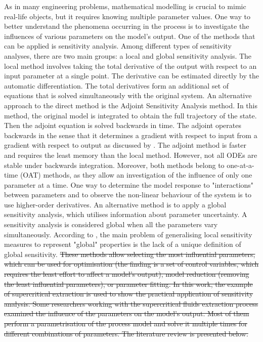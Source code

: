 \documentclass[a4paper,fleqn]{cas-dc}
\begin{document}
As in many engineering problems, mathematical modelling is crucial to mimic real-life objects, but it requires knowing multiple parameter values. One way to better understand the phenomena occurring in the process is to investigate the influences of various parameters on the model's output. One of the methods that can be applied is sensitivity analysis. Among different types of sensitivity analyses, there are two main groups: a local and global sensitivity analysis.
The local method involves taking the total derivative of the output with respect to an input parameter at a single point. The derivative can be estimated directly by the automatic differentiation. {\color{blue}The total derivatives form an additional set of equations that is solved simultaneously with the original system. An alternative approach to the direct method is the Adjoint Sensitivity Analysis method. In this method, the original model is integrated to obtain the full trajectory of the state. Then the adjoint equation is solved backwards in time. The adjoint operates backwards in the sense that it determines a gradient with respect to input from a gradient with respect to output as discussed by \citet{Errico1997}.}
The adjoint method is faster and requires the least memory than the local method. However, not all ODEs are stable under backwards integration. Moreover, both methods belong to one-at-a-time (OAT) methods, as they allow an investigation of the influence of only one parameter at a time. One way to determine the model response to "interactions" between parameters and to observe the non-linear behaviour of the system is to use higher-order derivatives.
An alternative method is to apply a global sensitivity analysis, which utilises information about parameter uncertainty. A sensitivity analysis is considered global when all the parameters vary simultaneously. According to \citet{Razavi2015}, the main problem of generalising local sensitivity measures to represent "global" properties is the lack of a unique definition of global sensitivity. 
\sout{These methods allow selecting the most influential parameters, which can be used for optimisation (the finding is a set of control variables, which requires the least effort to affect a model's output), model reduction (removing the least influential parameters), or parameter fitting. In this work, the example of supercritical extraction is used to show the practical application of sensitivity analysis. Some researchers working with the supercritical fluids extraction process examined the influence of the parameters on the model's output. Most of them perform a parametrisation of the process model and solve it multiple times for different combinations of parameters. The literature review is presented below.}
\end{document}
